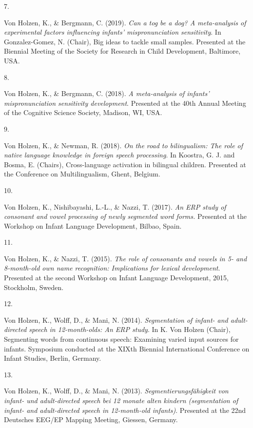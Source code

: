 \documentclass[10pt,a4paper,]{article}
\newlength{\cslhangindent}
\newlength{\csllabelwidth}
\newcommand{\CSLLeftMargin}[1]{\parbox[t]{\csllabelwidth}{\hfill #1~}}
\newcommand{\CSLRightInline}[1]{\parbox[t]{\linewidth - \cslhangindent - \csllabelwidth}{#1}\vspace{0.8ex}}
\begin{document}
\leavevmode{}%
\CSLLeftMargin{7. }%
\CSLRightInline{Von Holzen, K., \& Bergmann, C. (2019). \emph{Can a tog
be a dog? A meta-analysis of experimental factors influencing infants'
mispronunciation sensitivity}. In Gonzalez-Gomez, N. (Chair), Big ideas
to tackle small samples. Presented at the Biennial Meeting of the
Society for Research in Child Development, Baltimore, USA.}

\leavevmode{}%
\CSLLeftMargin{8. }%
\CSLRightInline{Von Holzen, K., \& Bergmann, C. (2018). \emph{A
meta-analysis of infants' mispronunciation sensitivity development}.
Presented at the 40th Annual Meeting of the Cognitive Science Society,
Madison, WI, USA.}

\leavevmode{}%
\CSLLeftMargin{9. }%
\CSLRightInline{Von Holzen, K., \& Newman, R. (2018). \emph{On the road
to bilingualism: The role of native language knowledge in foreign speech
processing}. In Koostra, G. J. and Bosma, E. (Chairs), Cross-language
activation in bilingual children. Presented at the Conference on
Multilingualism, Ghent, Belgium.}

\leavevmode{}%
\CSLLeftMargin{10. }%
\CSLRightInline{Von Holzen, K., Nishibayashi, L.-L., \& Nazzi, T.
(2017). \emph{An ERP study of consonant and vowel processing of newly
segmented word forms.} Presented at the Workshop on Infant Language
Development, Bilbao, Spain.}

\leavevmode{}%
\CSLLeftMargin{11. }%
\CSLRightInline{Von Holzen, K., \& Nazzi, T. (2015). \emph{The role of
consonants and vowels in 5- and 8-month-old own name recognition:
Implications for lexical development}. Presented at the second Workshop
on Infant Language Development, 2015, Stockholm, Sweden.}

\leavevmode{}%
\CSLLeftMargin{12. }%
\CSLRightInline{Von Holzen, K., Wolff, D., \& Mani, N. (2014).
\emph{Segmentation of infant- and adult-directed speech in
12-month-olds: An ERP study}. In K. Von Holzen (Chair), Segmenting words
from continuous speech: Examining varied input sources for infants.
Symposium conducted at the XIXth Biennial International Conference on
Infant Studies, Berlin, Germany.}

\leavevmode{}%
\CSLLeftMargin{13. }%
\CSLRightInline{Von Holzen, K., Wolff, D., \& Mani, N. (2013).
\emph{Segmentierungsfähigkeit von infant- und adult-directed speech bei
12 monate alten kindern (segmentation of infant- and adult-directed
speech in 12-month-old infants)}. Presented at the 22nd Deutsches EEG/EP
Mapping Meeting, Giessen, Germany.}
\end{document}
